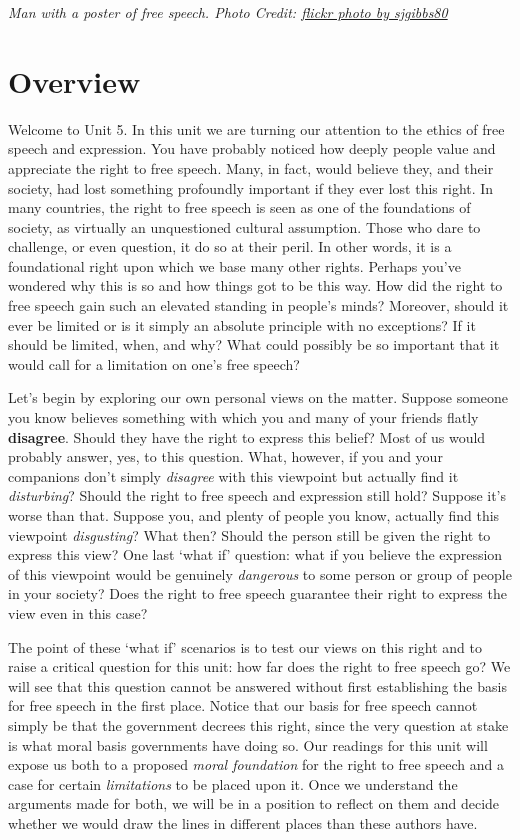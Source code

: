 \documentclass[
]{book}
\begin{document}
\emph{Man with a poster of free speech. Photo Credit: \href{https://flickr.com/photos/sjgibbs/117704119}{flickr photo by sjgibbs80}}

\hypertarget{overview-4}{%
\section*{Overview}\label{overview-4}}

Welcome to Unit 5. In this unit we are turning our attention to the ethics of free speech and expression. You have probably noticed how deeply people value and appreciate the right to free speech. Many, in fact, would believe they, and their society, had lost something profoundly important if they ever lost this right.
In many countries, the right to free speech is seen as one of the foundations of society, as virtually an unquestioned cultural assumption. Those who dare to challenge, or even question, it do so at their peril. In other words, it is a foundational right upon which we base many other rights.
Perhaps you've wondered why this is so and how things got to be this way. How did the right to free speech gain such an elevated standing in people's minds? Moreover, should it ever be limited or is it simply an absolute principle with no exceptions? If it should be limited, when, and why? What could possibly be so important that it would call for a limitation on one's free speech?

Let's begin by exploring our own personal views on the matter. Suppose someone you know believes something with which you and many of your friends flatly \textbf{disagree}. Should they have the right to express this belief? Most of us would probably answer, yes, to this question.
What, however, if you and your companions don't simply \emph{disagree} with this viewpoint but actually find it \emph{disturbing}? Should the right to free speech and expression still hold?
Suppose it's worse than that. Suppose you, and plenty of people you know, actually find this viewpoint \emph{disgusting}? What then? Should the person still be given the right to express this view?
One last `what if' question: what if you believe the expression of this viewpoint would be genuinely \emph{dangerous} to some person or group of people in your society? Does the right to free speech guarantee their right to express the view even in this case?

The point of these `what if' scenarios is to test our views on this right and to raise a critical question for this unit: how far does the right to free speech go? We will see that this question cannot be answered without first establishing the basis for free speech in the first place.
Notice that our basis for free speech cannot simply be that the government decrees this right, since the very question at stake is what moral basis governments have doing so. Our readings for this unit will expose us both to a proposed \emph{moral foundation} for the right to free speech and a case for certain \emph{limitations} to be placed upon it. Once we understand the arguments made for both, we will be in a position to reflect on them and decide whether we would draw the lines in different places than these authors have.
\end{document}
